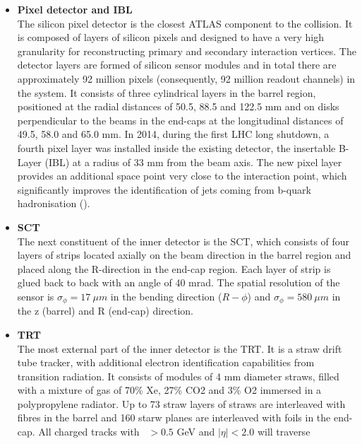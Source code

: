\documentclass[letterpaper,12pt]{article}
\begin{document}
	\begin{itemize}
		\item \textbf{Pixel detector and IBL}\\
	The silicon pixel detector is the closest ATLAS 
	component to the collision. It is composed of layers of
	silicon pixels and designed to have a very 
	high granularity for reconstructing primary 
	and secondary interaction vertices. 
	The detector layers are formed of silicon sensor modules and 
	in total there are approximately 92 million pixels 
	(consequently, 92 million readout channels) in the system.
	It consists of three cylindrical layers in the 
	barrel region, positioned at the radial distances of 
	50.5, 88.5 and 122.5 mm 
	and on disks perpendicular to the beams in the end-caps at the
	longitudinal distances of 49.5, 58.0 and 65.0 mm. 
	In 2014, during the first LHC long shutdown, a fourth pixel 
	layer was installed inside the existing detector, 
	the insertable B-Layer (IBL) at a radius of 33 mm 
	from the beam axis.
	The new pixel layer provides an 
	additional space point very close to the interaction point, 
	which significantly improves the identification of jets coming from 
	b-quark hadronisation (\bjets). 
	\item \textbf{SCT} \\
	The next constituent of the inner detector is the SCT, 
	which consists of four layers of strips located axially on the 
	beam direction in the barrel region and placed along the 
	\mbox{R-direction} in the end-cap region. 
	Each layer of strip is glued back to back with an angle of
	40 mrad. The spatial resolution of the sensor is 
	$\sigma_\phi = 17\ \mu m$ in the bending direction ($R-\phi$)
	and $\sigma_\phi = 580\ \mu m$ in the z (barrel) and R (end-cap) direction. 
	\item \textbf{TRT} \\
	The most external part of the inner detector is the TRT. 
	It is a straw drift tube tracker, with additional electron identification
	capabilities from transition radiation. It consists of
	modules of 4 mm diameter straws, filled with a mixture of gas of
	70\% Xe, 27\% CO2 and 3\% O2 immersed in a polypropylene radiator.
	Up to 73 straw layers of straws are interleaved with fibres in the barrel
	and 160 starw planes are interleaved with foils in the end-cap. 
	All charged tracks with \pt\ $> 0.5$ GeV and $|\eta| < 2.0$ will traverse 

\end{itemize}
\end{document}

